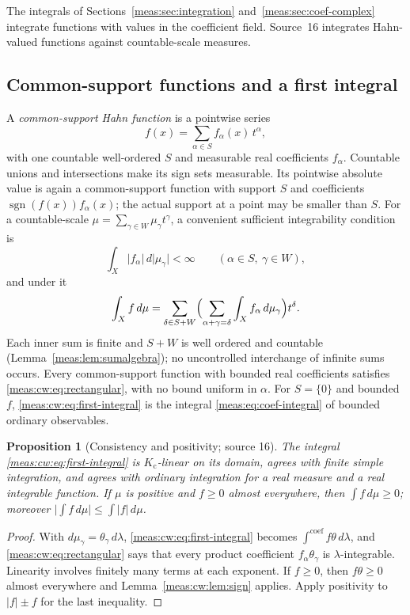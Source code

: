 \documentclass[11pt]{article}
\numberwithin{equation}{section}
\newtheorem{proposition}[theorem]{Proposition}
\theoremstyle{definition}
\theoremstyle{remark}
\newcommand{\abs}[1]{\lvert#1\rvert}
\newcommand{\Kc}{K_{\mathrm c}}
\newcommand{\intc}{\mathop{\int}\nolimits^{\mathrm{coef}}}
\begin{document}
The integrals of Sections~\ref{meas:sec:integration}
and~\ref{meas:sec:coef-complex} integrate functions with values in the
coefficient field. Source~16 integrates Hahn-valued functions against
countable-scale measures.

\subsection{Common-support functions and a first integral}

A \emph{common-support Hahn function} is a pointwise series
\begin{equation}\label{meas:cw:eq:common-support}
 f(x)=\sum_{\alpha\in S}f_\alpha(x)\,t^\alpha,
\end{equation}
with one countable well-ordered $S$ and measurable real coefficients $f_\alpha$.
Countable unions and intersections make its sign sets measurable. Its pointwise
absolute value is again a common-support function with support $S$ and
coefficients $\operatorname{sgn}(f(x))f_\alpha(x)$; the actual support at a point may
be smaller than $S$. For a countable-scale $\mu=\sum_{\gamma\in W}\mu_\gamma t^\gamma$, a
convenient sufficient integrability condition is
\begin{equation}\label{meas:cw:eq:rectangular}
 \int_X\abs{f_\alpha}\,d\abs{\mu_\gamma}<\infty\qquad(\alpha\in S,\ \gamma\in W),
\end{equation}
and under it
\begin{equation}\label{meas:cw:eq:first-integral}
 \int_Xf\,d\mu=\sum_{\delta\in S+W}\Bigl(\sum_{\alpha+\gamma=\delta}
 \int_Xf_\alpha\,d\mu_\gamma\Bigr)t^\delta .
\end{equation}
Each inner sum is finite and $S+W$ is well ordered and countable
(Lemma~\ref{meas:lem:sumalgebra}); no uncontrolled interchange of infinite sums
occurs. Every common-support function with bounded real coefficients satisfies
\eqref{meas:cw:eq:rectangular}, with no bound uniform in $\alpha$. For
$S=\{0\}$ and bounded $f$, \eqref{meas:cw:eq:first-integral} is the integral
\eqref{meas:eq:coef-integral} of bounded ordinary observables.

\begin{proposition}[Consistency and positivity; source 16]
\label{meas:cw:prop:first-integral}
The integral \eqref{meas:cw:eq:first-integral} is $\Kc$-linear on its domain,
agrees with finite simple integration, and agrees with ordinary integration for
a real measure and a real integrable function. If $\mu$ is positive and
$f\ge0$ almost everywhere, then $\int f\,d\mu\ge0$; moreover
$\abs{\int f\,d\mu}\le\int\abs f\,d\mu$.
\end{proposition}
\begin{proof}
With $d\mu_\gamma=\theta_\gamma\,d\lambda$, \eqref{meas:cw:eq:first-integral} becomes
$\intc f\theta\,d\lambda$, and \eqref{meas:cw:eq:rectangular} says that every
product coefficient $f_\alpha\theta_\gamma$ is $\lambda$-integrable. Linearity
involves finitely many terms at each exponent. If $f\ge0$, then $f\theta\ge0$
almost everywhere and Lemma~\ref{meas:cw:lem:sign} applies. Apply positivity to
$\abs f\pm f$ for the last inequality.
\end{proof}
\end{document}
